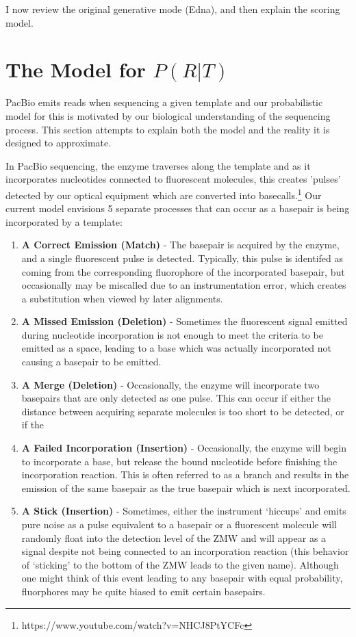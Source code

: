 \documentclass[fleqn,10pt]{SelfArx} %
\begin{document}
I now review the original generative mode (Edna), and then explain the scoring model.


\section{The Model for $P(R|T)$}

PacBio emits reads when sequencing a given template and our probabilistic model for this is motivated by our biological understanding of the sequencing process.  This section attempts to explain both the model and the reality it is designed to approximate.

In PacBio sequencing, the enzyme traverses along the template and as it incorporates nucleotides connected to fluorescent molecules, this creates 'pulses' detected by our optical equipment which are converted into basecalls.\footnote{https://www.youtube.com/watch?v=NHCJ8PtYCFc}  Our current model envisions 5 separate processes that can occur as a basepair is being incorporated by a template:


\begin{enumerate}
  \item \textbf{A Correct Emission (Match)} - The basepair is acquired by the enzyme, and a single fluorescent pulse is detected.  Typically, this pulse is identifed as coming from the corresponding fluorophore of the incorporated basepair, but occasionally may be miscalled due to an instrumentation error, which creates a substitution when viewed by later alignments.
  \item \textbf{A Missed Emission (Deletion)} - Sometimes the fluorescent signal emitted during nucleotide incorporation is not enough to meet the criteria to be emitted as a space, leading to a base which was actually incorporated not causing a basepair to be emitted.
  
    \item \textbf{A Merge (Deletion) } - Occasionally, the enzyme will incorporate two basepairs that are only detected as one pulse.  This can occur if either the distance between acquiring separate molecules is too short to be detected, or if the   
   
  
  \item \textbf{A Failed Incorporation (Insertion) } - Occasionally, the enzyme will begin to incorporate a base, but release the bound nucleotide before finishing the incorporation reaction.  This is often referred to as a branch and results in the emission of the same basepair as the true basepair which is next incorporated.
  
  \item \textbf{A Stick (Insertion) } - Sometimes, either the instrument `hiccups' and emits pure noise as a pulse equivalent to a basepair or a fluorescent molecule will randomly float into the detection level of the ZMW and will appear as a signal despite not being connected to an incorporation reaction (this behavior of `sticking' to the bottom of the ZMW leads to the given name).  Although one might think of this event leading to any basepair with equal probability, fluorphores may be quite biased to emit certain basepairs.
     
\end{enumerate}
\end{document}
